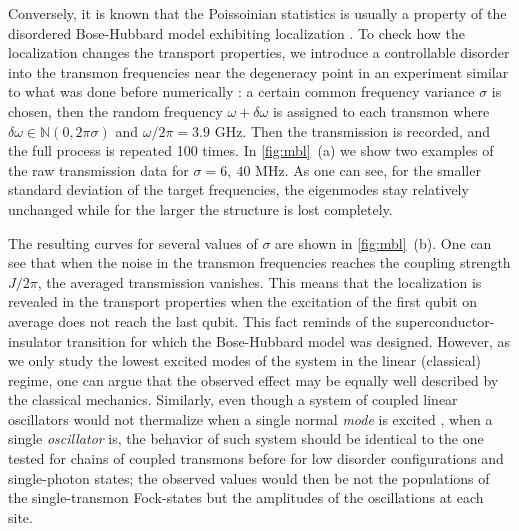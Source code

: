 \documentclass[%
 aps, pra,
 amsmath,amssymb,
 reprint,%
superscriptaddress
]{revtex4-2}
\begin{document}
Conversely, it is known that the Poissoinian statistics is usually a property of the disordered Bose-Hubbard model exhibiting localization \cite{roushan2017spectroscopic, Yan2019,Ye2019}. To check how the localization changes the transport properties, we introduce a controllable disorder into the transmon frequencies near the degeneracy point in an experiment similar to what was done before numerically \cite{orell2019probing}: a certain common frequency variance $\sigma$ is chosen, then the random frequency $\omega + \delta \omega$ is assigned to each transmon where $\delta\omega \in \mathbb N(0,2\pi\sigma)$ and $\omega/2\pi = 3.9$ GHz. Then the transmission is recorded, and the full process is repeated 100 times. 
In \autoref{fig:mbl}~(a) we show two examples of the raw transmission data for  $\sigma = 6,\ 40$ MHz. As one can see, for the smaller standard deviation of the target frequencies, the eigenmodes stay relatively unchanged while for the larger the structure is lost completely.

The resulting curves for several values of $\sigma$ are shown in \autoref{fig:mbl}~(b). One can see that when the noise in the transmon frequencies reaches the coupling strength $J/2\pi$, the averaged transmission vanishes. This means that the localization is revealed in the transport properties when the excitation of the first qubit on average does not reach the last qubit. This fact reminds of the superconductor-insulator transition \cite{bruder1993superconductor} for which the Bose-Hubbard model was designed. However, as we only study the lowest excited modes of the system in the linear (classical) regime, one can argue that the observed effect may be equally well described by the classical mechanics. Similarly, even though a system of coupled linear oscillators would not thermalize when a single normal \textit{mode} is excited \cite{deutsch2018eigenstate}, when a single \textit{oscillator} is, the behavior of such system should be identical to the one tested for chains of coupled transmons before \cite{Yan2019, ma2019dissipatively} for low disorder configurations and single-photon states; the observed values would then be not the populations of the single-transmon Fock-states but the amplitudes of the oscillations at each site.
\end{document}
